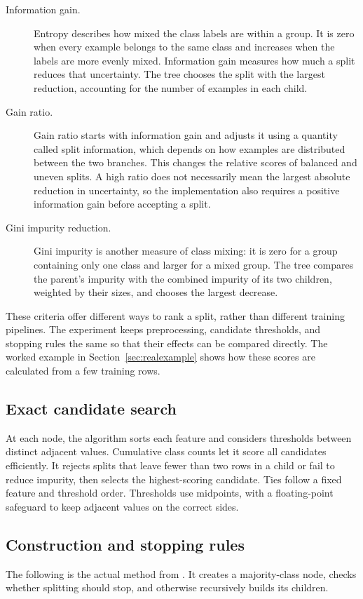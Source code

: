 \documentclass[11pt,letterpaper]{article}
\newcommand{\code}[1]{\texttt{\detokenize{#1}}}
\begin{document}
\begin{description}
\item[Information gain.] Entropy describes how mixed the class labels are
within a group. It is zero when every example belongs to the same class and
increases when the labels are more evenly mixed. Information gain measures how
much a split reduces that uncertainty. The tree chooses the split with the
largest reduction, accounting for the number of examples in each child.
\item[Gain ratio.] Gain ratio starts with information gain and adjusts it
using a quantity called split information, which depends on how examples are
distributed between the two branches. This changes the relative scores of
balanced and uneven splits. A high ratio does not necessarily mean the largest
absolute reduction in uncertainty, so the implementation also requires a
positive information gain before accepting a split.
\item[Gini impurity reduction.] Gini impurity is another measure of class mixing: it is
zero for a group containing only one class and larger for a mixed group.
The tree compares the parent's impurity with the combined impurity of its two
children, weighted by their sizes, and chooses the largest decrease.
\end{description}

These criteria offer different ways to rank a split, rather than different
training pipelines. The experiment keeps preprocessing, candidate thresholds,
and stopping rules the same so that their effects can be compared directly.
The worked example in Section~\ref{sec:realexample} shows how these scores
are calculated from a few training rows.

\subsection{Exact candidate search}
At each node, the algorithm sorts each feature and considers thresholds
between distinct adjacent values. Cumulative class counts let it score all
candidates efficiently. It rejects splits that leave fewer than two rows in
a child or fail to reduce impurity, then selects the highest-scoring candidate.
Ties follow a fixed feature and threshold order. Thresholds use midpoints,
with a floating-point safeguard to keep adjacent values on the correct sides.

\subsection{Construction and stopping rules}
The following is the actual \code{_build} method from
\code{algorithms/decision_tree.py}. It creates a majority-class node, checks
whether splitting should stop, and otherwise recursively builds its children.
\end{document}
